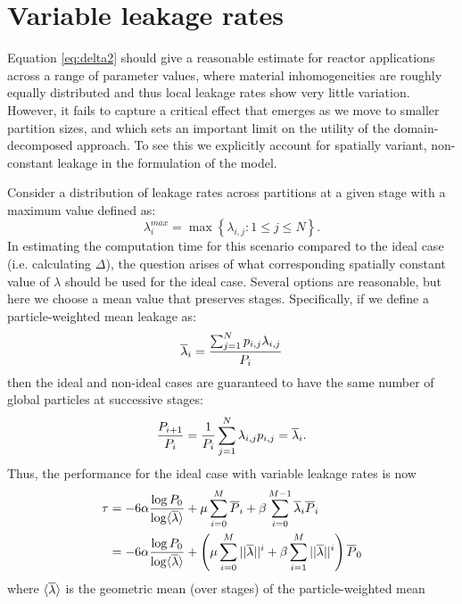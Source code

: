 \section{Variable leakage rates}
\label{sec:variable-leakage}

Equation \eqref{eq:delta2} should give a reasonable estimate for reactor
applications across a range of parameter values, where material inhomogeneities
are roughly equally distributed and thus local leakage rates show very little
variation. However, it fails to capture a critical effect that emerges as we
move to smaller partition sizes, and which sets an important limit on the
utility of the domain-decomposed approach. To see this we explicitly account for
spatially variant, non-constant leakage in the formulation of the model.

Consider a distribution of leakage rates across partitions at a given stage with
a maximum value defined as:
\begin{equation}
  \lambda^{max}_i = \max \left\{\lambda_{i,j} : 1 \le j \le N\right\}.
\end{equation}
In estimating the computation time for this scenario compared to the ideal case
(i.e. calculating $\Delta$), the question arises of what corresponding spatially
constant value of $\lambda$ should be used for the ideal case. Several options
are reasonable, but here we choose a mean value that preserves
stages. Specifically, if we define a particle-weighted mean leakage as:
\begin{equation}
  \label{eq:pmean}
  \overline{\lambda}_i = \frac{\sum_{j=1}^{N} p_{i,j} \lambda_{i,j}}{P_i}
\end{equation}
then the ideal and non-ideal cases are guaranteed to have the same number of
global particles at successive stages:
\begin{equation*}
  \frac{P_{i+1}}{P_i} = \frac{1}{P_i}\sum_{j=1}^N \lambda_{i,j} p_{i,j} =
  \overline{\lambda}_i.
\end{equation*}
Thus, the performance for the ideal case with variable leakage rates is now
\begin{align}
  \label{eq:tau2}
  \tau &= -6 \alpha \frac{\log P_0}{\log \langle \overline{\lambda} \rangle} + \mu \sum_{i=0}^M
  \overline{P}_i + \beta \sum_{i=0}^{M-1} \overline{\lambda}_i \overline{P}_i
  \nonumber \\ &= -6 \alpha \frac{\log P_0}{\log \langle \overline{\lambda} \rangle} + \left ( \mu
  \sum_{i=0}^M ||\overline{\lambda}||^i + \beta\sum_{i=1}^M
  ||\overline{\lambda}||^i \right ) \overline{P}_0
\end{align}
where $\langle \overline{\lambda} \rangle$ is the geometric mean (over stages) of the particle-weighted mean
